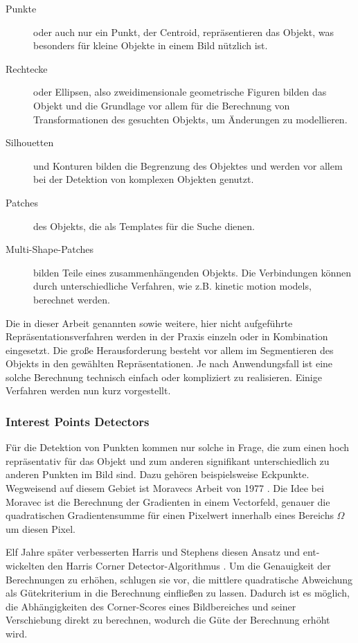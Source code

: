 \begin{description}
\item [{Punkte}] oder auch nur ein Punkt, der Centroid, repräsentieren das Objekt, was besonders für kleine Objekte in einem Bild nützlich ist.
\item [{Rechtecke}] oder Ellipsen, also zweidimensionale geometrische Figuren bilden das Objekt und die Grundlage vor allem für die Berechnung von Transformationen des gesuchten Objekts, um Änderungen zu modellieren.
\item [{Silhouetten}] und Konturen bilden die Begrenzung des Objektes und werden vor allem bei der Detektion von komplexen Objekten genutzt.
\item [{Patches}] des Objekts, die als Templates für die Suche dienen.
\item [{Multi-Shape-Patches}] bilden Teile eines zusammenhängenden Objekts. Die Verbindungen können durch unterschiedliche Verfahren, wie z.B. kinetic motion models, berechnet werden.
\end{description}

Die in dieser Arbeit genannten sowie weitere, hier nicht aufgeführte Repräsentationsverfahren werden in der Praxis einzeln oder in Kombination eingesetzt. Die große Herausforderung besteht vor allem im Segmentieren des Objekts in den gewählten Repräsentationen. Je nach Anwendungsfall ist eine solche Berechnung technisch einfach oder kompliziert zu realisieren. Einige Verfahren werden nun kurz vorgestellt.

\subsubsection{Interest Points Detectors}
Für die Detektion von Punkten kommen nur solche in Frage, die zum einen hoch repräsentativ für das Objekt und zum anderen signifikant unterschiedlich zu anderen Punkten im Bild sind. Dazu gehören beispielsweise Eckpunkte. Wegweisend auf diesem Gebiet ist Moravecs Arbeit von 1977 \cite{OAN}. Die Idee bei Moravec ist die Berechnung der Gradienten in einem Vectorfeld, genauer die quadratischen Gradientensumme für einen Pixelwert innerhalb eines Bereichs $\Omega$ um diesen Pixel.

Elf Jahre später verbesserten Harris und Stephens diesen Ansatz und ent-wickelten den Harris Corner Detector-Algorithmus \cite{HCD}. Um die Genauigkeit der Berechnungen zu erhöhen, schlugen sie vor, die mittlere quadratische Abweichung als Gütekriterium in die Berechnung einfließen zu lassen. Dadurch ist es möglich, die Abhängigkeiten des Corner-Scores eines Bildbereiches und seiner Verschiebung direkt zu berechnen, wodurch die Güte der Berechnung erhöht wird.

